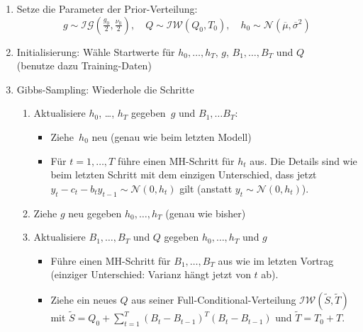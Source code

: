 \documentclass[10pt]{beamer}
\theoremstyle{definition}
\newcommand{\Normal}{\mathcal{N}} %
\newcommand{\InverseWishart}{\mathcal{IW}} %
\newcommand{\InverseGamma}{\mathcal{IG}} %
\newcommand{\stepOne}[1]{\textcolor{StepOneColor}{#1}}
\newcommand{\stepTwo}[1]{\textcolor{StepTwoColor}{#1}}
\newcommand{\stepThree}[1]{\textcolor{StepThreeColor}{#1}}
\begin{document}
\begin{frame}[t]
  \begin{enumerate}
    \item<2->[A.] Setze die Parameter der Prior-Verteilung:
    \[
      g \sim \InverseGamma(\tfrac{g_0}{2}, \tfrac{\nu_0}{2}), \quad
      Q \sim \InverseWishart(Q_0, T_0), \quad
      h_0 \sim \Normal(\overline{\mu}, \overline{\sigma}^2)
    \]
    \item<3->[B.] Initialisierung: Wähle Startwerte für $h_0, \ldots, h_T$, $g$, $B_1, \ldots, B_T$ und $Q$ \\
    (benutze dazu Training-Daten)
    \item<4->[C.] Gibbs-Sampling: Wiederhole die Schritte
    \begin{enumerate}
      \item<5->[\stepOne{1.}] Aktualisiere \stepOne{$h_0$, \ldots, $h_T$} gegeben~\stepTwo{$g$} und \stepThree{$B_1, \ldots B_T$}:
      \begin{itemize}
        \item<6-> Ziehe~$h_0$ neu (genau wie beim letzten Modell)
        \item<7-> Für $t = 1, \ldots, T$ führe einen MH-Schritt für $h_t$ aus.
        Die Details sind wie beim letzten Schritt mit dem einzigen Unterschied, dass jetzt $y_t - c_t - b_t y_{t-1} \sim \Normal(0, h_t)$ gilt (anstatt $y_t \sim \Normal(0, h_t)$).
      \end{itemize}
      \item<8->[\stepTwo{2.}] Ziehe \stepTwo{$g$} neu gegeben \stepOne{$h_0, \ldots, h_T$} (genau wie bisher)
      \item<9->[\stepThree{3.}] Aktualisiere \stepThree{$B_1, \ldots, B_T$} und \stepThree{$Q$} gegeben \stepOne{$h_0, \ldots, h_T$} und \stepTwo{$g$}
      \begin{itemize}
        \item<10-> Führe einen MH-Schritt für \stepThree{$B_1, \ldots, B_T$} aus wie im letzten Vortrag (einziger Unterschied: Varianz hängt jetzt von $t$ ab).
        \item<11-> Ziehe ein neues $Q$ aus seiner Full-Conditional-Verteilung $\InverseWishart(\tilde{S}, \tilde{T})$ mit $\tilde{S} = Q_0 + \sum_{t=1}^T (B_t - B_{t-1})^T (B_t - B_{t-1})$ und $\tilde{T} = T_0 + T$.
      \end{itemize}
    \end{enumerate}
  \end{enumerate}
\end{frame}
\end{document}
